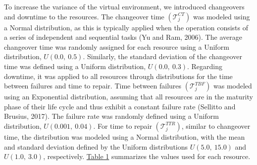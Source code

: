 To increase the variance of the virtual environment, we introduced
changeovers and downtime to the resources. The changeover time
\(\left( \mathcal{T}_{j}^{CT} \right)\) was modeled using a Normal
distribution, as this is typically applied when the operation consists
of a series of independent and sequential tasks (Yu and Ram, 2006). The
average changeover time was randomly assigned for each resource using a
Uniform distribution, \(U(0.0,\ 0.5)\). Similarly, the standard
deviation of the changeover time was defined using a Uniform
distribution, \(U(0.0,\ 0.3)\). Regarding downtime, it was applied to
all resources through distributions for the time between failures and
time to repair. Time between failures
\(\left( \mathcal{T}_{j}^{TBF} \right)\) was modeled using an
Exponential distribution, assuming that all resources are in the
maturity phase of their life cycle and thus exhibit a constant failure
rate (Sellitto and Brusius, 2017). The failure rate was randomly defined
using a Uniform distribution, \(U(0.001,\ 0.04)\). For time to repair
\(\left( \mathcal{T}_{j}^{TTR} \right)\), similar to changeover time,
the distribution was modeled using a Normal distribution, with the mean
and standard deviation defined by the Uniform distributions
\(U(5.0,\ 15.0)\) and \(U(1.0,\ 3.0)\), respectively.
\colorbox{yellow!40}{}\hyperref[_Ref187517135]{Table 1} summarizes the values used for
each resource.


